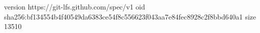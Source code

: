 version https://git-lfs.github.com/spec/v1
oid sha256:bf134554b4f40549da6383ce54f8c556623f043aa7e84fec8928c2f8bbd640a1
size 13510

